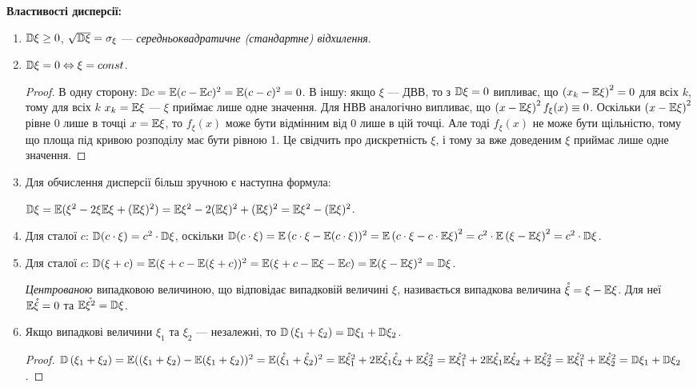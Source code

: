 \noindent \textbf{Властивості дисперсії:}
\begin{enumerate}
    \item $\mathbb{D}\xi \geq 0$, $\sqrt{\mathbb{D}\xi} = \sigma_\xi$ --- \emph{середньоквадратичне (стандартне) відхилення}.
    \item $\mathbb{D}\xi = 0 \Leftrightarrow \xi = const$.
    \begin{proof}
        В одну сторону: $\mathbb{D} c = \mathbb{E}(c - \mathbb{E} c)^2 = \mathbb{E}(c - c)^2 = 0$. В іншу: якщо $\xi$ --- ДВВ,
        то з $\mathbb{D}\xi = 0$ випливає, що $\left(x_k-\mathbb{E}\xi\right)^2 = 0$ для всіх $k$,
        тому для всіх $k$ $x_k = \mathbb{E} \xi$ --- $\xi$ приймає лише одне значення.
        Для НВВ аналогічно випливає, що $\left(x-\mathbb{E}\xi\right)^2 f_\xi(x) \equiv 0$. Оскільки $\left(x-\mathbb{E}\xi\right)^2$
        рівне $0$ лише в точці $x=\mathbb{E}\xi$, то $f_\xi(x)$ може бути відмінним від 0 лише в цій точці. Але тоді $f_\xi(x)$ не може бути щільністю,
        тому що площа під кривою розподілу має бути рівною 1. Це свідчить про дискретність $\xi$,
        і тому за вже доведеним $\xi$ приймає лише одне значення.
    \end{proof}
    \item Для обчислення дисперсії більш зручною є наступна формула:

    $\mathbb{D}\xi = \mathbb{E}(\xi^2 - 2\xi \mathbb{E}\xi +(\mathbb{E}\xi)^2) = \mathbb{E}\xi^2 - 2(\mathbb{E}\xi)^2 + (\mathbb{E}\xi)^2 = \mathbb{E}\xi^2 - (\mathbb{E}\xi)^2$. 
    \item Для сталої $c$: $\mathbb{D}(c\cdot \xi) = c^2\cdot \mathbb{D}\xi$, оскільки $\mathbb{D}(c\cdot \xi) = \mathbb{E}\left(c\cdot\xi-\mathbb{E}(c\cdot\xi\right))^2 = \mathbb{E}\left(c\cdot\xi - c\cdot \mathbb{E}\xi\right)^2 = c^2 \cdot \mathbb{E}\left(\xi-\mathbb{E}\xi\right)^2 = c^2 \cdot \mathbb{D}\xi$.
    \item Для сталої $c$: $\mathbb{D}(\xi + c) = \mathbb{E}(\xi + c - \mathbb{E}(\xi + c))^2 = \mathbb{E}(\xi + c - \mathbb{E}\xi - \mathbb{E} c) = \mathbb{E}(\xi - \mathbb{E}\xi)^2 = \mathbb{D}\xi$.
\begin{definition}
    \emph{Центрованою} випадковою величиною, що відповідає випадковій величині $\xi$, називається 
    випадкова величина $\mathring{\xi} = \xi - \mathbb{E}\xi$. Для неї $\mathbb{E}\mathring{\xi} = 0$ та 
    $\mathbb{E}\mathring{\xi^2} = \mathbb{D}\xi$.
\end{definition}
    \item Якщо випадкові величини $\xi_1$ та $\xi_2$ --- незалежні, то
    $\mathbb{D}\left(\xi_1 + \xi_2\right) = \mathbb{D}\xi_1 + \mathbb{D}\xi_2$.
    \begin{proof}
        $\mathbb{D}\left(\xi_1 + \xi_2\right) = \mathbb{E}((\xi_1 + \xi_2) - \mathbb{E}(\xi_1 + \xi_2))^2 = \mathbb{E}(\mathring{\xi}_1 + \mathring{\xi}_2)^2 =
        \mathbb{E}\mathring{\xi}_1^2 + 2\mathbb{E}\mathring{\xi}_1\mathring{\xi}_2 + \mathbb{E}\mathring{\xi}_2^2 = 
        \mathbb{E}\mathring{\xi}_1^2 + 2\mathbb{E}\mathring{\xi}_1 \mathbb{E}\mathring{\xi}_2 + \mathbb{E}\mathring{\xi}_2^2 =
        \mathbb{E}\mathring{\xi}_1^2 + \mathbb{E}\mathring{\xi}_2^2 = \mathbb{D}\xi_1 + \mathbb{D}\xi_2$.
    \end{proof}
\end{enumerate}

